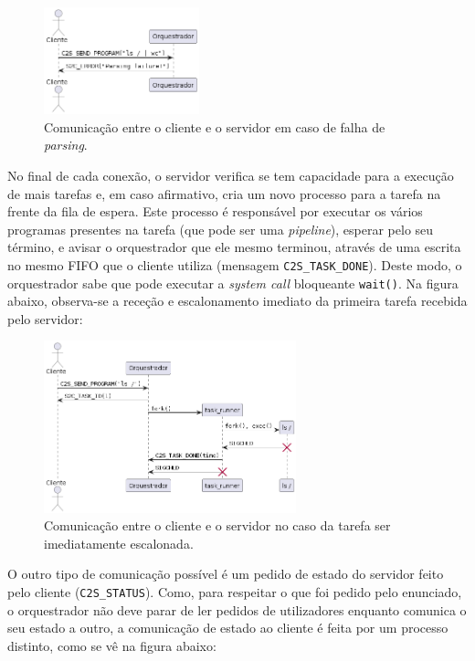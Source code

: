 \documentclass[11pt]{article}
\begin{document}
\begin{figure}[H]
    \centering
    \includegraphics[width=0.4\textwidth]{report_figures/CommunicationParsingFailure.png}
    \caption{Comunicação entre o cliente e o servidor em caso de falha de \emph{parsing}.}
\end{figure}

No final de cada conexão, o servidor verifica se tem capacidade para a execução de mais tarefas e,
em caso afirmativo, cria um novo processo para a tarefa na frente da fila de espera. Este processo é
responsável por executar os vários programas presentes na tarefa (que pode ser uma \emph{pipeline}),
esperar pelo seu término, e avisar o orquestrador que ele mesmo terminou, através de uma escrita no
mesmo FIFO que o cliente utiliza (mensagem \texttt{C2S\_TASK\_DONE}). Deste modo, o orquestrador
sabe que pode executar a \emph{system call} bloqueante \texttt{wait()}. Na figura abaixo, observa-se
a receção e escalonamento imediato da primeira tarefa recebida pelo servidor:

\begin{figure}[H]
    \centering
    \includegraphics[width=0.65\textwidth]{report_figures/CommunicationSchedule.png}
    \caption{Comunicação entre o cliente e o servidor no caso da tarefa ser imediatamente
        escalonada.}
\end{figure}

O outro tipo de comunicação possível é um pedido de estado do servidor feito pelo cliente
(\texttt{C2S\_STATUS}). Como, para respeitar o que foi pedido pelo enunciado, o orquestrador não
deve parar de ler pedidos de utilizadores enquanto comunica o seu estado a outro, a comunicação de
estado ao cliente é feita por um processo distinto, como se vê na figura abaixo:
\end{document}
